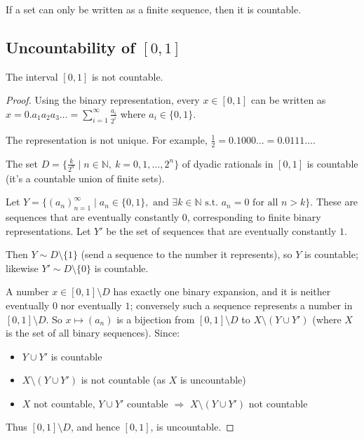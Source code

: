 \documentclass[11pt]{report}
\begin{document}
\begin{notebox}
If a set can only be written as a finite sequence, then it is countable.
\end{notebox}

\subsection{Uncountability of $[0,1]$}

\begin{exbox}
The interval $[0,1]$ is not countable.
\end{exbox}

\begin{proof}
Using the binary representation, every $x \in [0,1]$ can be written as $x = 0.a_1a_2a_3\ldots = \sum_{i=1}^\infty \frac{a_i}{2^i}$ where $a_i \in \{0,1\}$.

\begin{rembox}
The representation is not unique. For example, $\frac{1}{2} = 0.1000\ldots = 0.0111\ldots$.
\end{rembox}

The set $D = \{\frac{k}{2^n} \mid n \in \mathbb{N},\ k = 0, 1, \ldots, 2^n\}$ of dyadic rationals in $[0,1]$ is countable (it's a countable union of finite sets).

Let $Y = \{(a_n)_{n=1}^\infty \mid a_n \in \{0,1\}, \text{ and } \exists k \in \mathbb{N} \text{ s.t. } a_n = 0 \text{ for all } n > k\}$. These are sequences that are eventually constantly $0$, corresponding to finite binary representations. Let $Y'$ be the set of sequences that are eventually constantly $1$.

Then $Y \sim D \setminus \{1\}$ (send a sequence to the number it represents), so $Y$ is countable; likewise $Y' \sim D \setminus \{0\}$ is countable.

A number $x \in [0,1] \setminus D$ has exactly one binary expansion, and it is neither eventually $0$ nor eventually $1$; conversely such a sequence represents a number in $[0,1] \setminus D$. So $x \mapsto (a_n)$ is a bijection from $[0,1] \setminus D$ to $X \setminus (Y \cup Y')$ (where $X$ is the set of all binary sequences). Since:
\begin{itemize}
    \item $Y \cup Y'$ is countable
    \item $X \setminus (Y \cup Y')$ is not countable (as $X$ is uncountable)
    \item $X$ not countable, $Y \cup Y'$ countable $\Rightarrow$ $X \setminus (Y \cup Y')$ not countable
\end{itemize}

Thus $[0,1] \setminus D$, and hence $[0,1]$, is uncountable.
\end{proof}
\end{document}
